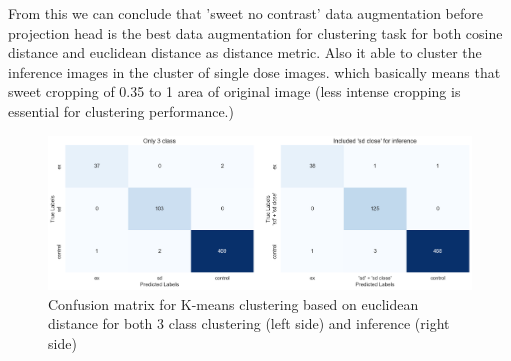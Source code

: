 From this we can conclude that 'sweet no contrast' data augmentation before projection head is the best data augmentation for clustering task for both cosine distance and euclidean distance as distance metric. Also it able to cluster the inference images in the cluster of single dose images.  which basically means that sweet cropping of 0.35 to 1 area of original image (less intense cropping is essential for clustering performance.)

\begin{table}[H]
    \centering
    \caption{Inference evaluation results on euclidean distance based on K-means}
    \label{tab:eucli_table}
\end{table}


\begin{figure}[H]
    \centering
    \includegraphics[scale=0.37]{figures/econfuse.png} 
    \caption{Confusion matrix for K-means clustering based on euclidean distance for both 3 class clustering (left side) and inference (right side)}
    \label{fig:econfuse}
\end{figure}

